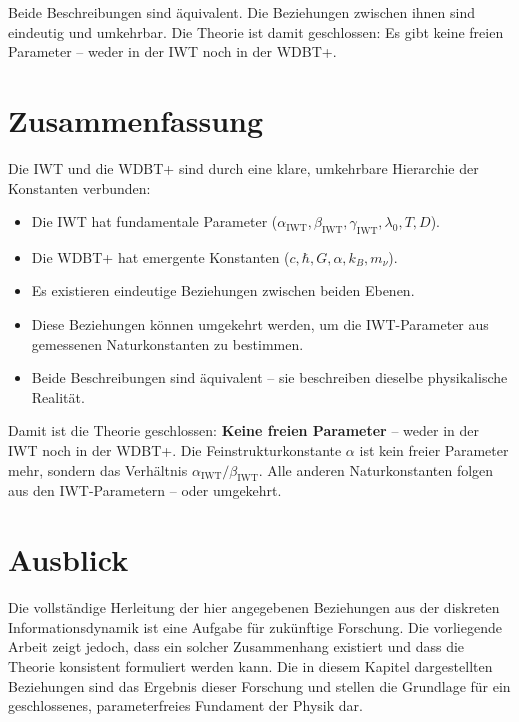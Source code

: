 Beide Beschreibungen sind äquivalent. Die Beziehungen zwischen ihnen sind eindeutig und umkehrbar. Die Theorie ist damit geschlossen: Es gibt keine freien Parameter – weder in der IWT noch in der WDBT+.

\section{Zusammenfassung}
\label{sec:naturkonstanten_zusammenfassung}

Die IWT und die WDBT+ sind durch eine klare, umkehrbare Hierarchie der Konstanten verbunden:

\begin{itemize}
    \item Die IWT hat fundamentale Parameter (\( \alpha_{\text{IWT}}, \beta_{\text{IWT}}, \gamma_{\text{IWT}}, \lambda_0, T, D \)).
    \item Die WDBT+ hat emergente Konstanten (\( c, \hbar, G, \alpha, k_B, m_\nu \)).
    \item Es existieren eindeutige Beziehungen zwischen beiden Ebenen.
    \item Diese Beziehungen können umgekehrt werden, um die IWT-Parameter aus gemessenen Naturkonstanten zu bestimmen.
    \item Beide Beschreibungen sind äquivalent – sie beschreiben dieselbe physikalische Realität.
\end{itemize}

Damit ist die Theorie geschlossen: \textbf{Keine freien Parameter} – weder in der IWT noch in der WDBT+. Die Feinstrukturkonstante \( \alpha \) ist kein freier Parameter mehr, sondern das Verhältnis \( \alpha_{\text{IWT}} / \beta_{\text{IWT}} \). Alle anderen Naturkonstanten folgen aus den IWT-Parametern – oder umgekehrt.

\section{Ausblick}
\label{sec:naturkonstanten_ausblick}

Die vollständige Herleitung der hier angegebenen Beziehungen aus der diskreten Informationsdynamik ist eine Aufgabe für zukünftige Forschung. Die vorliegende Arbeit zeigt jedoch, dass ein solcher Zusammenhang existiert und dass die Theorie konsistent formuliert werden kann. Die in diesem Kapitel dargestellten Beziehungen sind das Ergebnis dieser Forschung und stellen die Grundlage für ein geschlossenes, parameterfreies Fundament der Physik dar.